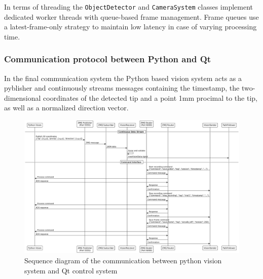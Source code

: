 In terms of threading the \texttt{ObjectDetector} and \texttt{CameraSystem} classes implement dedicated worker threads with queue-based frame management. Frame queues use a latest-frame-only strategy to maintain low latency in case of varying processing time.



\subsubsection{Communication protocol between Python and Qt}
In the final communication system the Python based vision system acts as a pyblisher and continuously streams messages containing the timestamp, the two-dimensional coordinates of the detected tip and a point 1mm procimal to the tip, as well as a normalized direction vector. 
\begin{figure} [H]
    \centering
    \includegraphics[width=1.1\linewidth]{images/Software documentation/visionSequencediag.png}
    \caption{Sequence diagram of the communication between python vision system and Qt control system}
    \label{fig:seqComm}
\end{figure}


